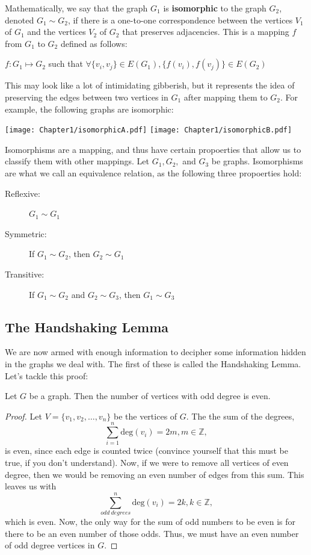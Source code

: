 Mathematically, we say that the graph $G_1$ is \textbf{isomorphic} to the graph $G_2$, denoted $G_1 \sim G_2$, if there is a one-to-one correspondence between the vertices $V_1$ of $G_1$ and the vertices $V_2$ of $G_2$ that preserves adjacencies. This is a mapping $f$ from $G_1$ to $G_2$ defined as follows:
\begin{center}
    $f : G_1 \mapsto G_2$ such that $\forall \{v_i, v_j\} \in E(G_1), \{f(v_i), f(v_j)\} \in E(G_2)$
\end{center}
This may look like a lot of intimidating gibberish, but it represents the idea of preserving the edges between two vertices in $G_1$ after mapping them to $G_2$. For example, the following graphs are isomorphic:
\begin{center}
    \texttt{[image: Chapter1/isomorphicA.pdf]} %
    \texttt{[image: Chapter1/isomorphicB.pdf]} %
\end{center}
Isomorphisms are a mapping, and thus have certain propoerties that allow us to classify them with other mappings. Let $G_1, G_2,$ and $G_3$ be graphs. Isomorphisms are what we call an equivalence relation, as the following three propoerties hold:
\begin{description}
    \item[Reflexive:] $G_1 \sim G_1$
    \item[Symmetric:] If $G_1 \sim G_2$, then $G_2 \sim G_1$
    \item[Transitive:] If $G_1 \sim G_2$ and $G_2 \sim G_3$, then $G_1 \sim G_3$
\end{description}

\subsection{The Handshaking Lemma}
We are now armed with enough information to decipher some information hidden in the graphs we deal with. The first of these is called the Handshaking Lemma. Let's tackle this proof:

\begin{lemma}
    Let $G$ be a graph. Then the number of vertices with odd degree is even.
\end{lemma}
\begin{proof}
    Let $V = \{v_1, v_2, \ldots, v_n\}$ be the vertices of $G$. The the sum of the degrees,
    \begin{equation*}
        \sum_{i=1}^n \text{deg}(v_i) = 2m, m \in \mathbb{Z},
    \end{equation*}
    is even, since each edge is counted twice (convince yourself that this must be true, if you don't understand). Now, if we were to remove all vertices of even degree, then we would be removing an even number of edges from this sum. This leaves us with
    \begin{equation*}
        \sum_{odd~degrees}^n \text{deg}(v_i) = 2k, k \in \mathbb{Z},
    \end{equation*}
    which is even. Now, the only way for the sum of odd numbers to be even is for there to be an even number of those odds. Thus, we must have an even number of odd degree vertices in $G$.
\end{proof}
